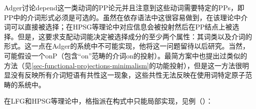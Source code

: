 Adger讨论depend这一类动词的PP论元并且注意到这些动词需要特定的PPs，即PP中的介词形式必须是可选的。虽然在依存语法中这很容易做到，在该理论中介词可以直接被选择；在HPSG等理论中对应信息会被投射然后在PP结点上被选择。但是，这要求支配动词能决定被选择成分的至少两个属性：其词类以及介词的形式。这一点在Adger的系统中不可能实现，他将这一问题留待以后研究。当然，可能假设一个onP（包含“on”范畴的介词on的投射）。最简方案中也提出过类似的方法（见\ref{sec-functional-projections-minimalism}的功能投射），但是这一方法很明显没有反映所有介词短语有共性这一现象，这些共性无法反映在使用词特定原子范畴的系统中。

在LFG\indexlfgc 和HPSG\indexhpsgc 等理论中，格指派在构式中只能局部实现，见例（）：

